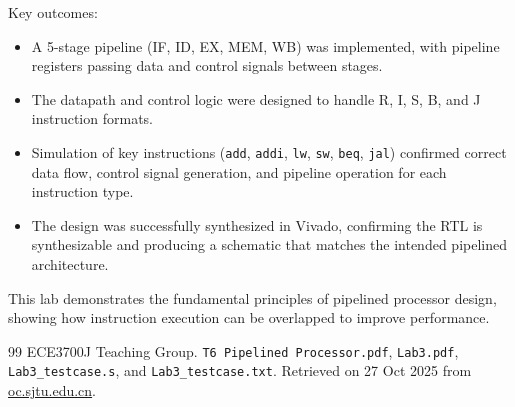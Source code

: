 \documentclass{article}
\begin{document}
Key outcomes:
\begin{itemize}
    \item A 5-stage pipeline (IF, ID, EX, MEM, WB) was implemented, with pipeline registers passing data and control signals between stages.
    \item The datapath and control logic were designed to handle R, I, S, B, and J instruction formats.
    \item Simulation of key instructions (\texttt{add}, \texttt{addi}, \texttt{lw}, \texttt{sw}, \texttt{beq}, \texttt{jal}) confirmed correct data flow, control signal generation, and pipeline operation for each instruction type.
    \item The design was successfully synthesized in Vivado, confirming the RTL is synthesizable and producing a schematic that matches the intended pipelined architecture.
\end{itemize}

This lab demonstrates the fundamental principles of pipelined processor design, showing how instruction execution can be overlapped to improve performance.

\newpage
\begin{thebibliography}{99} 
 ECE3700J Teaching Group. \texttt{T6 Pipelined Processor.pdf}, \texttt{Lab3.pdf}, \texttt{Lab3\_testcase.s}, and \texttt{Lab3\_testcase.txt}. Retrieved on 27 Oct 2025 from \hyperlink{site}{oc.sjtu.edu.cn}.
\end{thebibliography}
\end{document}

